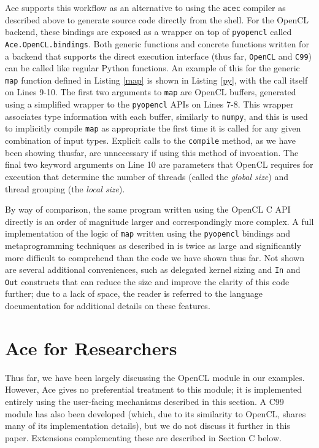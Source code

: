 \documentclass{sig-alternate}
\begin{document}
Ace supports this workflow as an alternative to using the \verb|acec| compiler as described above to generate  source code directly from the shell. For the OpenCL backend, these bindings are exposed as a wrapper on top of \verb|pyopencl| called \verb|Ace.OpenCL.bindings|. Both generic functions and concrete functions written for a backend that supports the direct execution interface (thus far, \verb|OpenCL| and \verb|C99|) can be called like regular Python functions. An example of this for the generic \verb|map| function defined in Listing \ref{map} is shown in Listing \ref{py}, with the call itself on Lines 9-10. The first two arguments to \verb|map| are OpenCL buffers, generated using a simplified wrapper to the \verb|pyopencl| APIs on Lines 7-8. This wrapper associates type information with each buffer, similarly to \verb|numpy|, and this is used to implicitly compile \verb|map| as appropriate the first time it is called for any given combination of input types. Explicit calls to the \verb|compile| method, as we have been showing thusfar, are unnecessary if using this method of invocation. The final two keyword arguments on Line 10 are parameters that OpenCL requires for execution that determine the number of threads (called the {\em global size}) and thread grouping (the {\em local size}). 

By way of comparison, the same program written using the OpenCL C API directly is an order of magnitude larger and correspondingly more complex. A full implementation of the logic of \verb|map| written using the \verb|pyopencl| bindings and metaprogramming techniques as described in \cite{pyopencl} is twice as large and significantly more difficult to comprehend than the code we have shown thus far. Not shown are several additional conveniences, such as delegated kernel sizing and \verb|In| and \verb|Out| constructs that can reduce the size and improve the clarity of this code further; due to a lack of space, the reader is referred to the language documentation for additional details on these features.

\section{Ace for Researchers}
Thus far, we have been largely discussing the OpenCL module in our examples. However, Ace gives no preferential treatment to this module; it is implemented entirely using the user-facing mechanisms described in this section. A C99 module has also been developed (which, due to its similarity to OpenCL, shares many of its implementation details), but we do not discuss it further in this paper. Extensions complementing these are described in Section C below.
\end{document}
